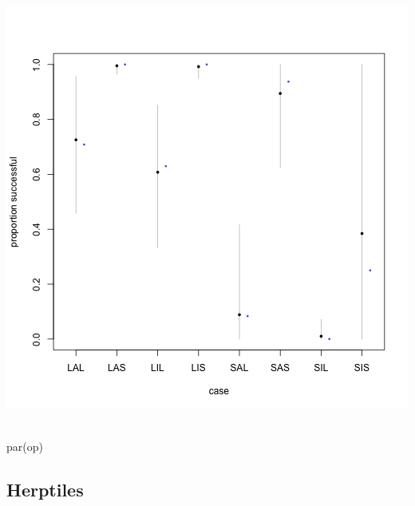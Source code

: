 \documentclass{article}
\makeatletter
\newcommand{\hlcomment}[1]{\textcolor[rgb]{.18,.6,.34}{#1}}%
\newcommand{\hlstd}[1]{\textcolor[rgb]{0,0,0}{#1}}%
\newenvironment{kframe}{%
 \def\FrameCommand##1{\hskip\@totalleftmargin \hskip-\fboxsep
 \colorbox{shadecolor}{##1}\hskip-\fboxsep
     \hskip-\linewidth \hskip-\@totalleftmargin \hskip\columnwidth}%
 \MakeFramed {\advance\hsize-\width
   \@totalleftmargin\z@ \linewidth\hsize
   \@setminipage}}%
 {\par\unskip\endMakeFramed}
\newenvironment{knitrout}{}{} %
\makeatother
\begin{document}
\begin{knitrout}
{\begin{kframe}
\begin{flushleft}
\normalfont
\end{flushleft}
\includegraphics{better-model-fig2} \begin{flushleft}
\ttfamily\noindent
\hspace*{\fill}\\
\hlstd{}\hlcomment{\usebox{\hlnormalsizeboxhash}par(op)}\mbox{}
\normalfont
\end{flushleft}
\end{kframe}}
\end{knitrout}


\subsection*{Herptiles}
\end{document}
